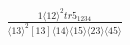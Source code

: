 \documentclass[varwidth, border=5pt]{standalone}
\begin{document}
\begin{my}
$\begin{gathered}
\scriptscriptstyle\frac{1⟨12⟩^2tr5_{1234}}{⟨13⟩^2[13]⟨14⟩⟨15⟩⟨23⟩⟨45⟩}
\end{gathered}$
\end{my}
\end{document}
